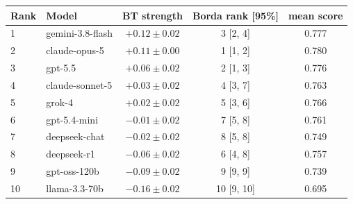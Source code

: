 \begin{tabular}{llccc}
\toprule
Rank & Model & BT strength & Borda rank [95\%] & mean score \\
\midrule
1 & gemini-3.8-flash & $+0.12 \pm 0.02$ & 3 [2, 4] & 0.777 \\
2 & claude-opus-5 & $+0.11 \pm 0.00$ & 1 [1, 2] & 0.780 \\
3 & gpt-5.5 & $+0.06 \pm 0.02$ & 2 [1, 3] & 0.776 \\
4 & claude-sonnet-5 & $+0.03 \pm 0.02$ & 4 [3, 7] & 0.763 \\
5 & grok-4 & $+0.02 \pm 0.02$ & 5 [3, 6] & 0.766 \\
6 & gpt-5.4-mini & $-0.01 \pm 0.02$ & 7 [5, 8] & 0.761 \\
7 & deepseek-chat & $-0.02 \pm 0.02$ & 8 [5, 8] & 0.749 \\
8 & deepseek-r1 & $-0.06 \pm 0.02$ & 6 [4, 8] & 0.757 \\
9 & gpt-oss-120b & $-0.09 \pm 0.02$ & 9 [9, 9] & 0.739 \\
10 & llama-3.3-70b & $-0.16 \pm 0.02$ & 10 [9, 10] & 0.695 \\
\bottomrule
\end{tabular}
